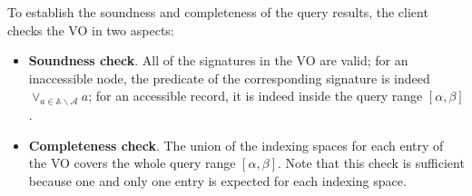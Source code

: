 To establish the soundness and completeness of the query results, the client checks the VO in two aspects:
\begin{itemize}
  \item \textbf{Soundness check}. All of the signatures in the VO are valid; for an inaccessible node, the predicate of the corresponding signature is indeed $\lor_{a \in \mathbb{A}\backslash\mathcal{A}} a$; for an accessible record, it is indeed inside the query range $[\alpha, \beta]$.
  \item \textbf{Completeness check}. The union of the indexing spaces for each entry of the VO covers the whole query range $[\alpha, \beta]$. Note that this check is sufficient because one and only one entry is expected for each indexing space.
\end{itemize}

